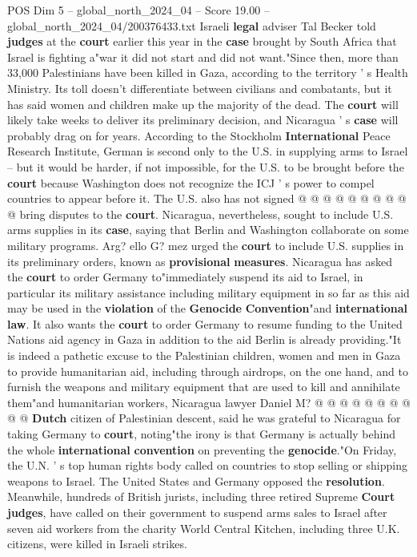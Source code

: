 \begin{textsample}{POS Dim 5 – global\_north\_2024\_04 – Score 19.00 – global\_north\_2024\_04/200376433.txt}
Israeli \textbf{legal} adviser Tal Becker told \textbf{judges} at the \textbf{court} earlier this year in the \textbf{case} brought by South Africa that Israel is fighting a"war it did not start and did not want."Since then, more than 33,000 Palestinians have been killed in Gaza, according to the territory ' s Health Ministry.
Its toll doesn't differentiate between civilians and combatants, but it has said women and children make up the majority of the dead.
The \textbf{court} will likely take weeks to deliver its preliminary decision, and Nicaragua ' s \textbf{case} will probably drag on for years.
According to the Stockholm \textbf{International} Peace Research Institute, German is second only to the U.S. in supplying arms to Israel -- but it would be harder, if not impossible, for the U.S. to be brought before the \textbf{court} because Washington does not recognize the ICJ ' s power to compel countries to appear before it.
The U.S. also has not signed @ @ @ @ @ @ @ @ @ @ bring disputes to the \textbf{court}.
Nicaragua, nevertheless, sought to include U.S. arms supplies in its \textbf{case}, saying that Berlin and Washington collaborate on some military programs.
Arg? ello G? mez urged the \textbf{court} to include U.S. supplies in its preliminary orders, known as \textbf{provisional} \textbf{measures}.
Nicaragua has asked the \textbf{court} to order Germany to"immediately suspend its aid to Israel, in particular its military assistance including military equipment in so far as this aid may be used in the \textbf{violation} of the \textbf{Genocide} \textbf{Convention}"and \textbf{international} \textbf{law}.
It also wants the \textbf{court} to order Germany to resume funding to the United Nations aid agency in Gaza in addition to the aid Berlin is already providing."It is indeed a pathetic excuse to the Palestinian children, women and men in Gaza to provide humanitarian aid, including through airdrops, on the one hand, and to furnish the weapons and military equipment that are used to kill and annihilate them"and humanitarian workers, Nicaragua lawyer Daniel M? @ @ @ @ @ @ @ @ @ @ \textbf{Dutch} citizen of Palestinian descent, said he was grateful to Nicaragua for taking Germany to \textbf{court}, noting"the irony is that Germany is actually behind the whole \textbf{international} \textbf{convention} on preventing the \textbf{genocide}."On Friday, the U.N. ' s top human rights body called on countries to stop selling or shipping weapons to Israel.
The United States and Germany opposed the \textbf{resolution}.
Meanwhile, hundreds of British jurists, including three retired Supreme \textbf{Court} \textbf{judges}, have called on their government to suspend arms sales to Israel after seven aid workers from the charity World Central Kitchen, including three U.K. citizens, were killed in Israeli strikes.

\end{textsample}
